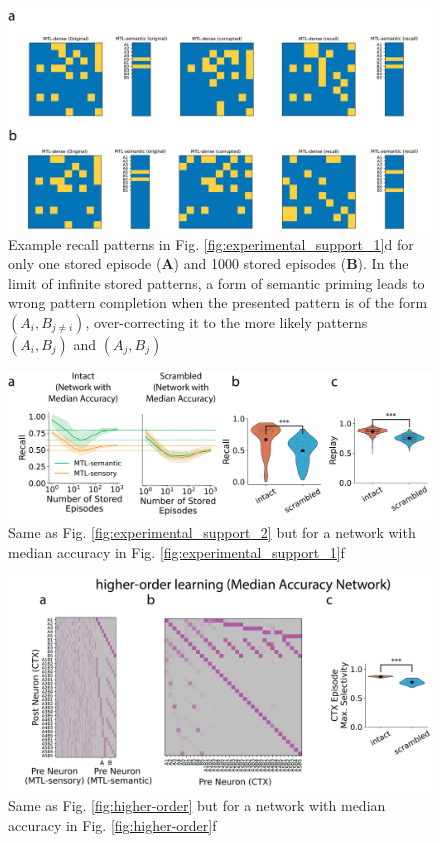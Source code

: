\documentclass{article}
\begin{document}
\begin{figure}[h!]
    \centering
    \includegraphics[width=0.95\linewidth]{Figures/Figure_6_supp_1.png}
    \caption{Example recall patterns in Fig. \ref{fig:experimental_support_1}d for only one stored episode (\textbf{A}) and 1000 stored episodes (\textbf{B}). In the limit of infinite stored patterns, a form of semantic priming leads to wrong pattern completion when the presented pattern is of the form $(A_i, B_{j\neq i})$, over-correcting it to the more likely patterns $(A_i, B_j)$ and $(A_j, B_j)$}
    \label{fig:experimental_support_2_supp_1}
\end{figure}

\begin{figure}[h!]
    \centering
    \includegraphics[width=0.95\linewidth]{Figures/Figure_6_supp_2.png}
    \caption{Same as Fig. \ref{fig:experimental_support_2} but for a network with median accuracy in Fig. \ref{fig:experimental_support_1}f}
    \label{fig:experimental_support_2_supp_2}
\end{figure}

\begin{figure}[h!]
    \centering
    \includegraphics[width=0.95\linewidth]{Figures/Figure_7_supp.png}
    \caption{Same as Fig. \ref{fig:higher-order} but for a network with median accuracy in Fig. \ref{fig:higher-order}f}
    \label{fig:higher_order_supp}
\end{figure}
\end{document}
